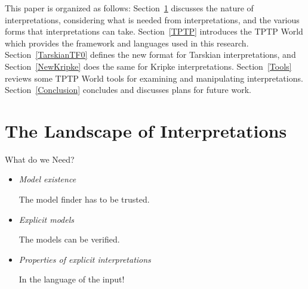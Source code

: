 \documentclass{easychair}
\newenvironment{packed_itemize}{
\vspace*{-0.2em}
\begin{itemize}
\setlength{\partopsep}{0pt}
\setlength{\itemsep}{1pt}
\setlength{\parskip}{0pt}
\setlength{\parsep}{0pt}
}{\end{itemize}}
\begin{document}
This paper is organized as follows:
Section~\ref{Interpretations} discusses the nature of interpretations, considering what is
needed from interpretations, and the various forms that interpretations can take.
Section~\ref{TPTP} introduces the TPTP World which provides the framework and languages used
in this research.
Section~\ref{TarskianTF0} defines the new format for Tarskian interpretations, and
Section~\ref{NewKripke} does the same for Kripke interpretations.
Section~\ref{Tools} reviews some TPTP World tools for examining and manipulating interpretations.
Section~\ref{Conclusion} concludes and discusses plans for future work.

\section{The Landscape of Interpretations}
\label{Interpretations}

What do we Need?
\begin{itemize}
\item {\em Model existence}
      The model finder has to be trusted.
\item {\em Explicit models}
      The models can be verified.
\item {\em Properties of explicit interpretations}
      In the language of the input!
\end{itemize}
\end{document}
